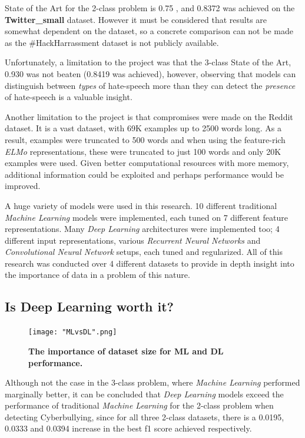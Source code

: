 \documentclass[12pt,a4paper]{article}
\begin{document}
State of the Art for the 2-class problem is 0.75 \cite{Hack}, and 0.8372 was achieved on the \textbf{Twitter\_small} dataset. However it must be considered that results are somewhat dependent on the dataset, so a concrete comparison can not be made as the \#HackHarrassment dataset is not publicly available. 

Unfortunately, a limitation to the project was that the 3-class State of the Art, 0.930 \cite{Badjatiya} was not beaten (0.8419 was achieved), however, observing that models can distinguish between \textit{types} of hate-speech more than they can detect the \textit{presence} of hate-speech is a valuable insight.

Another limitation to the project is that compromises were made on the Reddit dataset. It is a vast dataset, with 69K examples up to 2500 words long. As a result, examples were truncated to 500 words and when using the feature-rich \textit{ELMo} representations, these were truncated to just 100 words and only 20K examples were used. Given better computational resources with more memory, additional information could be exploited and perhaps performance would be improved. 

A huge variety of models were used in this research. 10 different traditional \textit{Machine Learning} models were implemented, each tuned on 7 different feature representations. Many \textit{Deep Learning} architectures were implemented too; 4 different input representations, various \textit{Recurrent Neural Networks} and \textit{Convolutional Neural Network} setups, each tuned and regularized. All of this research was conducted over 4 different datasets to provide in depth insight into the importance of data in a problem of this nature. 


\subsection{Is Deep Learning worth it?}
\begin{figure}
	\centering
	\vspace{-30pt}
	\texttt{[image: "MLvsDL".png]} 
	\caption{\textbf{The importance of dataset size for ML and DL performance.}}
	\label{MLvsDL}
\end{figure}

Although not the case in the 3-class problem, where \textit{Machine Learning} performed marginally better, it can be concluded that \textit{Deep Learning} models exceed the performance of traditional \textit{Machine Learning} for the 2-class problem when detecting Cyberbullying, since for all three 2-class datasets, there is a 0.0195, 0.0333 and 0.0394 increase in the best f1 score achieved respectively. 
\end{document}
